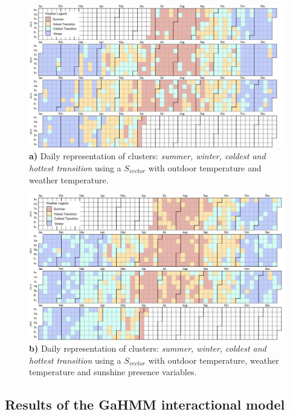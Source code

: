 \begin{figure}[h!]
  \vspace{0.5em} %
  \includegraphics[scale=0.45]{Figures/temperatures.jpg}
  \caption{\textbf{a)} Daily representation of clusters: \textit{summer, winter, coldest and hottest transition} using a $S_{vector}$ with outdoor temperature and weather temperature.}
  \label{fig:s_vector_temperature}
\end{figure}

\begin{figure}[h!]
  \vspace{0.5em} %
  \includegraphics[scale=0.45]{Figures/sushine.jpg}
  \caption{\textbf{b)} Daily representation of clusters: \textit{summer, winter, coldest and hottest transition} using a $S_{vector}$ with outdoor temperature, weather temperature and sunshine presence variables.}
  \label{fig:s_vector_sunshine}
\end{figure}




\subsection{Results of the GaHMM interactional model}
\label{sec:interactional_results}

